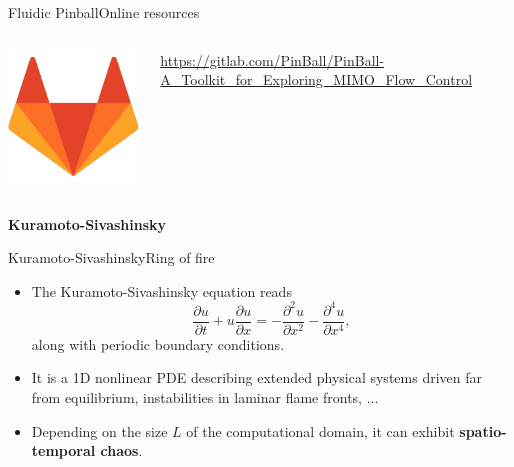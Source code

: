 \documentclass[usenames,dvipsnames,svgnames,10pt,aspectratio=169]{beamer}
\begin{document}
\begin{frame}[t, c]{Fluidic Pinball}{Online resources}
	  \begin{minipage}{.9\textwidth}
			\begin{columns}
				\begin{column}{.2\textwidth}
					\centering
					\includegraphics[height=.15\textheight]{gitlab}
				\end{column}
				\begin{column}{.7\textwidth}
					\url{https://gitlab.com/PinBall/PinBall-A_Toolkit_for_Exploring_MIMO_Flow_Control}
				\end{column}
			\end{columns}
		\end{minipage}
\end{frame}



\begin{frame}[t, c]{}
	\centering
	\vspace{1cm}

	{\Large \textbf{Kuramoto-Sivashinsky}}

	\bigskip

	{}

\end{frame}

\begin{frame}[t, c]{Kuramoto-Sivashinsky}{Ring of fire}
	\begin{itemize}
		\item The Kuramoto-Sivashinsky equation reads
		$$\displaystyle \frac{\partial u}{\partial t} + u \frac{\partial u}{\partial x} = - \frac{\partial^2 u}{\partial x^2} - \frac{\partial^4 u}{\partial x^4},$$
		along with periodic boundary conditions.

		\bigskip

		\item It is a 1D nonlinear PDE describing extended physical systems driven far from equilibrium, instabilities in laminar flame fronts, ...

		\bigskip

		\item Depending on the size $L$ of the computational domain, it can exhibit \alert{\textbf{spatio-temporal chaos}}.
	\end{itemize}

	\vspace{1cm}
\end{frame}
\end{document}
